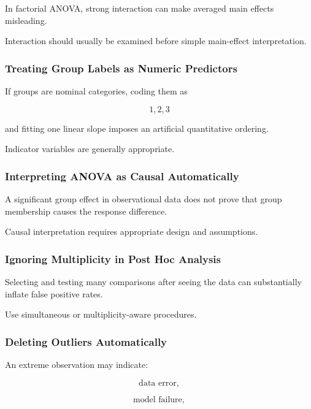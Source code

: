In factorial ANOVA, strong interaction can make averaged main effects
misleading.

Interaction should usually be examined before simple main-effect
interpretation.

\subsubsection{Treating Group Labels as Numeric Predictors}

If groups are nominal categories, coding them as

\[
1,2,3
\]

and fitting one linear slope imposes an artificial quantitative ordering.

Indicator variables are generally appropriate.

\subsubsection{Interpreting ANOVA as Causal Automatically}

A significant group effect in observational data does not prove that
group membership causes the response difference.

Causal interpretation requires appropriate design and assumptions.

\subsubsection{Ignoring Multiplicity in Post Hoc Analysis}

Selecting and testing many comparisons after seeing the data can
substantially inflate false positive rates.

Use simultaneous or multiplicity-aware procedures.

\subsubsection{Deleting Outliers Automatically}

An extreme observation may indicate:

\[
\boxed{
\text{data error},
}
\]

\[
\boxed{
\text{model failure},
}
\]

